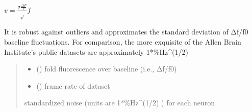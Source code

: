 \documentclass[letterpaper,10pt,english]{sphinxmanual}
\begin{document}
\begin{fulllineitems}
\label{\detokenize{CalSciPy.trace_processing:CalSciPy.trace_processing.calculate_standardized_noise}}
\pysigstartsignatures
{}
\pysigstopsignatures\begin{description}
\begin{DUlineblock}{0em}
\item[] \(v = \frac{\sigma \frac{\Delta F}F}\sqrt{f}\)
\end{DUlineblock}

\end{description}

\sphinxAtStartPar
It is robust against outliers and approximates the standard deviation of Δf/f0 baseline fluctuations.
For comparison, the more exquisite of the Allen Brain Institute’s public datasets are approximately 1*\%Hz\textasciicircum{}(\sphinxhyphen{}1/2)
\begin{quote}\begin{description}
\begin{itemize}
\item {} 
\sphinxAtStartPar
{} () \textendash{} fold fluorescence over baseline (i.e., Δf/f0)

\item {} 
\sphinxAtStartPar
{} () \textendash{} frame rate of dataset

\end{itemize}

\sphinxAtStartPar
standardized noise (units are  1*\%Hz\textasciicircum{}(\sphinxhyphen{}1/2) ) for each neuron

\sphinxAtStartPar
{}

\end{description}\end{quote}

\end{fulllineitems}
\end{document}
